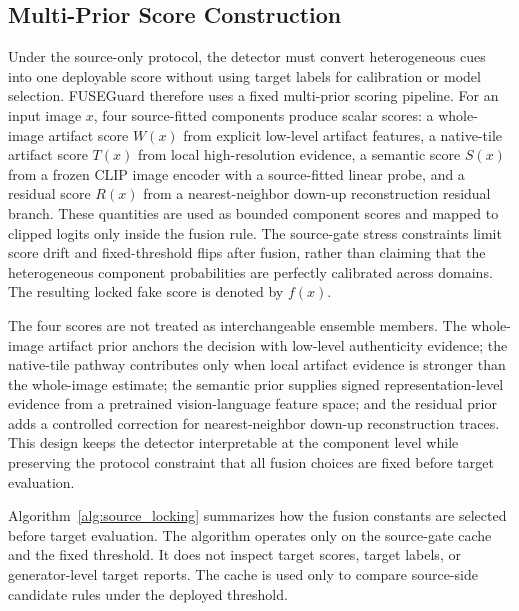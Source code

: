 \documentclass[letterpaper,journal]{IEEEtran}
\begin{document}
\subsection{Multi-Prior Score Construction}
\label{sec:method_scoring}

Under the source-only protocol, the detector must convert heterogeneous cues into one deployable score without using target labels for calibration or model selection. FUSEGuard therefore uses a fixed multi-prior scoring pipeline. For an input image $x$, four source-fitted components produce scalar scores: a whole-image artifact score $W(x)$ from explicit low-level artifact features, a native-tile artifact score $T(x)$ from local high-resolution evidence, a semantic score $S(x)$ from a frozen CLIP image encoder with a source-fitted linear probe, and a residual score $R(x)$ from a nearest-neighbor down-up reconstruction residual branch. These quantities are used as bounded component scores and mapped to clipped logits only inside the fusion rule. The source-gate stress constraints limit score drift and fixed-threshold flips after fusion, rather than claiming that the heterogeneous component probabilities are perfectly calibrated across domains. The resulting locked fake score is denoted by $f(x)$.

The four scores are not treated as interchangeable ensemble members. The whole-image artifact prior anchors the decision with low-level authenticity evidence; the native-tile pathway contributes only when local artifact evidence is stronger than the whole-image estimate; the semantic prior supplies signed representation-level evidence from a pretrained vision-language feature space; and the residual prior adds a controlled correction for nearest-neighbor down-up reconstruction traces. This design keeps the detector interpretable at the component level while preserving the protocol constraint that all fusion choices are fixed before target evaluation.

Algorithm~\ref{alg:source_locking} summarizes how the fusion constants are selected before target evaluation. The algorithm operates only on the source-gate cache and the fixed threshold. It does not inspect target scores, target labels, or generator-level target reports. The cache is used only to compare source-side candidate rules under the deployed threshold.
\end{document}

